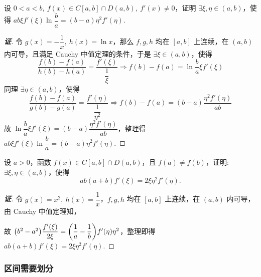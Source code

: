 \begin{example}
    设 $0<a<b,~f(x)\in C[a,b]\cap D(a,b),~f'(x)\neq0$，证明 $\exists\xi,\eta\in(a,b)$，使得 $ab\xi f'(\xi)\ln\dfrac{b}{a}=(b-a)\eta^2f'(\eta).$
\end{example}
\begin{proof}[{\songti \textbf{证}}]
    令 $g(x)=-\dfrac{1}{x},~h(x)=\ln x$，那么 $f,g,h$ 均在 $[a,b]$ 上连续，在 $(a,b)$ 内可导，且满足 Cauchy 中值定理的条件，于是
    $\exists\xi\in(a,b)\text{，使得 }$
    $$\dfrac{f(b)-f(a)}{h(b)-h(a)}=\dfrac{f'(\xi)}{\dfrac{1}{\xi}}\Rightarrow f(b)-f(a)=\ln\dfrac{b}{a}\xi f'(\xi)$$
    同理
    $\exists\eta\in(a,b)\text{，使得 }$
    $$\dfrac{f(b)-f(a)}{g(b)-g(a)}=\dfrac{f'(\eta)}{\dfrac{1}{\eta^2}}\Rightarrow f(b)-f(a)=(b-a)\dfrac{\eta^2f'(\eta)}{ab}$$
    故 $\ln\dfrac{b}{a}\xi f'(\xi)=(b-a)\dfrac{\eta^2f'(\eta)}{ab}$，整理得 $ab\xi f'(\xi)\ln\dfrac{b}{a}=(b-a)\eta^2f'(\eta).$
\end{proof}

\begin{example}
    设 $a>0$，函数 $f(x)\in C[a,b]\cap D(a,b)$，且 $f(a)\neq f(b)$，证明: $\exists \xi,\eta\in(a,b)$，使得 $$ab(a+b)f'(\xi)=2\xi\eta^2f'(\eta).$$
\end{example}
\begin{proof}[{\songti \textbf{证}}]
    令 $g(x)=x^2,~h(x)=\dfrac{1}{x}$，$f,g,h$ 均在 $[a,b]$ 上连续，在 $(a,b)$ 内可导，由 Cauchy 中值定理知，
    故 $\qty(b^2-a^2)\dfrac{f'(\xi)}{2\xi}=\qty(\dfrac{1}{a}-\dfrac{1}{b})f'(\eta)\eta^2$，整理即得 $ab(a+b)f'(\xi)=2\xi\eta^2f'(\eta).$
\end{proof}

\subsubsection{区间需要划分}

